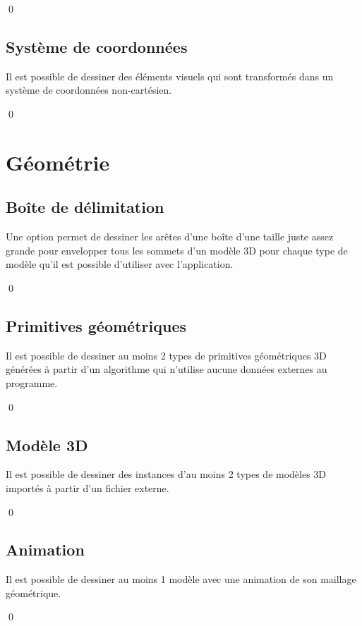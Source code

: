 \documentclass[12pt]{article}
\newcommand{\state}{\noindent}
\begin{document}
\qed

\subsection{Système de coordonnées}

\state
Il est possible de dessiner des éléments visuels qui sont transformés dans un système de coordonnées non-cartésien.

\qed


\pagebreak

\section{Géométrie}

\subsection{Boîte de délimitation}

\state
Une option permet de dessiner les arêtes d'une boîte d'une taille juste assez grande pour envelopper tous les sommets d'un modèle 3D pour chaque type de modèle qu'il est possible d'utiliser avec l'application.

\qed

\subsection{Primitives géométriques}

\state
Il est possible de dessiner au moins 2 types de primitives géométriques 3D générées à partir d'un algorithme qui n'utilise aucune données externes au programme.

\qed

\subsection{Modèle 3D}

\state
Il est possible de dessiner des instances d'au moins 2 types de modèles 3D importés à partir d'un fichier externe.

\qed

\subsection{Animation}

\state
Il est possible de dessiner au moins 1 modèle avec une animation de son maillage géométrique.

\qed
\end{document}
